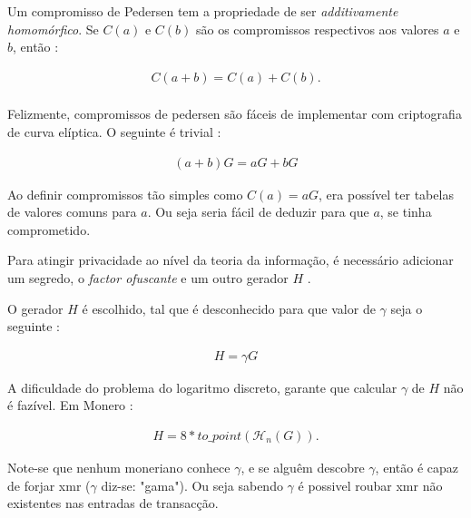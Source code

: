 Um compromisso de Pedersen tem a propriedade de ser {\em additivamente homomórfico}. 
Se \(C(a)\) e \(C(b)\) são os compromissos respectivos aos valores \(a\) e \(b\), então :

\begin{align*}
C(a + b) = C(a) + C(b) . 
\end{align*}
\\
Felizmente, compromissos de pedersen são fáceis de implementar com criptografia de curva elíptica. O seguinte é trivial : 

\begin{align*}
(a + b) G = a G + b G 
\end{align*}

Ao definir compromissos tão simples como \(C(a) = a G\), era possível ter tabelas de valores comuns para $a$. Ou seja seria fácil de deduzir para que $a$, se tinha comprometido. 

Para atingir privacidade ao nível da teoria da informação, é necessário adicionar um segredo, o {\em factor ofuscante} e um outro gerador \(H\) .

O gerador \(H\) é escolhido, tal que é desconhecido para que valor de \(\gamma\) seja o seguinte :

\begin{align*}
H = \gamma G
\end{align*}

A dificuldade do problema do logaritmo discreto, garante que calcular $\gamma$ de $H$ não é fazível.
Em Monero :

\begin{align*}
H = 8*to\_point(\mathcal{H}_n(G)).
\end{align*}

Note-se que nenhum moneriano conhece $\gamma$, e se alguêm descobre $\gamma$, então é capaz de forjar xmr ($\gamma$ diz-se: "gama"). Ou seja sabendo $\gamma$ é possivel roubar xmr não existentes nas entradas de transacção.



